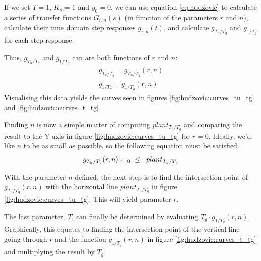 If we set $T=1$, $K_s=1$  and  $y_0=0$, we can use equation \ref{eq:hudzovic} to
calculate  a  series  of  transfer functions $G_{r,n}(s)$ (in  function  of  the
parameters   $r$  and  $n$),  calculate  their  time   domain   step   responses
$g_{r,n}(t)$,  and  calculate  $g_{T_u/T_g}$  and  $g_{1/T_g}$   for  each  step
response.

Thus, $g_{T_u/T_g}$ and $g_{1/T_g}$ can are both functions of $r$ and $n$:
\begin{align}
    g_{T_u/T_g} = g_{T_u/T_g}(r, n) \\
    g_{1/T_g}  =  g_{1/T_g}(r,n)
\end{align}
Visualising    this    data    yields    the     curves    seen    in    figures
\ref{fig:hudzovic:curves_tu_tg}        and       \ref{fig:hudzovic:curves_t_tg}.

Finding $n$ is now a simple matter of  computing $plant_{T_u/T_g}$ and comparing
the  result  to the Y axis in figure \ref{fig:hudzovic:curves_tu_tg} for  $r=0$.
Ideally, we'd  like  $n$  to  be as small as possible, so the following equation
must be satisfied.
\begin{equation}
    g_{T_u/T_g}(r, n)\lvert_{r=0} \hspace{2mm} \le \hspace{2mm} plant_{T_u/T_g}
\end{equation}

With the parameter $n$ defined, the next step is to find  the intersection point
of $g_{T_u/T_g}(r, n)$  with  the  horizontal  line  $plant_{T_u/T_g}$ in figure
\ref{fig:hudzovic:curves_tu_tg}. This will yield parameter $r$.

The last parameter, $T$,  can  finally  be  determined  by evaluating $T_g \cdot
g_{1/T_g}(r, n)$. Graphically, this equates to finding the intersection point of
the vertical line going through $r$ and the function $g_{1/T_g}(r, n)$ in figure
\ref{fig:hudzovic:curves_t_tg} and multiplying the result by $T_g$.

